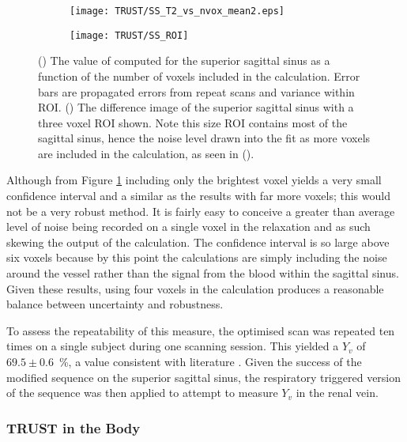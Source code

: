 \begin{figure}[H]
	\centering
	\begin{subfigure}[c]{0.47\textwidth}
		\centering
		\texttt{[image: TRUST/SS\_T2\_vs\_nvox\_mean2.eps]}
		\caption{}
		\label{fig:nvox_SS}
	\end{subfigure}
	\hfill
	\begin{subfigure}[c]{0.47\textwidth}
		\centering
		\texttt{[image: TRUST/SS\_ROI]}
		\caption{}
		\label{fig:SS_ROI}
	\end{subfigure}
	\caption{() The value of \ttwo computed for the superior sagittal sinus as a function of the number of voxels included in the calculation. Error bars are propagated errors from repeat scans and variance within \ac{ROI}. () The difference image of the superior sagittal sinus with a three voxel \ac{ROI} shown. Note this size \ac{ROI} contains most of the sagittal sinus, hence the noise level drawn into the fit as more voxels are included in the calculation, as seen in ().}
	\label{fig:nv_SS}
\end{figure}

\newpage
Although from Figure \ref{fig:nvox_SS} including only the brightest voxel yields a very small confidence interval and a similar \ttwo as the results with far more voxels; this would not be a very robust method. It is fairly easy to conceive a greater than average level of noise being recorded on a single voxel in the relaxation and as such skewing the output of the calculation. The confidence interval is so large above six voxels because by this point the calculations are simply including the noise around the vessel rather than the signal from the blood within the sagittal sinus. Given these results, using four voxels in the calculation produces a reasonable balance between uncertainty and robustness.

To assess the repeatability of this measure, the optimised scan was repeated ten times on a single subject during one scanning session. This yielded a $Y_v$ of $69.5\pm0.6$~\%, a value consistent with literature \cite{nagdyman_comparison_2005, liu_multi-site_2016}. Given the success of the modified sequence on the superior sagittal sinus, the respiratory triggered version of the sequence was then applied to attempt to measure $Y_v$ in the renal vein.

\subsubsection{\ac{TRUST} in the Body}

